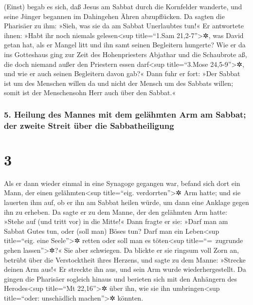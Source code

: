  (Einst) begab es sich, daß Jesus am Sabbat durch die
Kornfelder wanderte, und seine Jünger begannen im Dahingehen Ähren
abzupflücken.  Da sagten die Pharisäer zu ihm: »Sieh, was
sie da am Sabbat Unerlaubtes tun!«  Er antwortete ihnen:
»Habt ihr noch niemals gelesen\textless sup title=``1.Sam
21,2-7''\textgreater✲, was David getan hat, als er Mangel litt und ihn
samt seinen Begleitern hungerte?  Wie er da ins
Gotteshaus ging zur Zeit des Hohenpriesters Abjathar und die Schaubrote
aß, die doch niemand außer den Priestern essen darf\textless sup
title=``3.Mose 24,5-9''\textgreater✲, und wie er auch seinen Begleitern
davon gab?«  Dann fuhr er fort: »Der Sabbat ist um des
Menschen willen da und nicht der Mensch um des Sabbats willen;
 somit ist der Menschensohn Herr auch über den Sabbat.«

\hypertarget{heilung-des-mannes-mit-dem-geluxe4hmten-arm-am-sabbat-der-zweite-streit-uxfcber-die-sabbatheiligung}{%
\subsubsection{5. Heilung des Mannes mit dem gelähmten Arm am Sabbat;
der zweite Streit über die
Sabbatheiligung}\label{heilung-des-mannes-mit-dem-geluxe4hmten-arm-am-sabbat-der-zweite-streit-uxfcber-die-sabbatheiligung}}

\hypertarget{section-2}{%
\section{3}\label{section-2}}

 Als er dann wieder einmal in eine Synagoge gegangen war,
befand sich dort ein Mann, der einen gelähmten\textless sup title=``eig.
verdorrten''\textgreater✲ Arm hatte;  und sie lauerten ihm
auf, ob er ihn am Sabbat heilen würde, um dann eine Anklage gegen ihn zu
erheben.  Da sagte er zu dem Manne, der den gelähmten Arm
hatte: »Stehe auf (und tritt vor) in die Mitte!«  Dann
fragte er sie: »Darf man am Sabbat Gutes tun, oder (soll man) Böses tun?
Darf man ein Leben\textless sup title=``eig. eine Seele''\textgreater✲
retten oder soll man es töten\textless sup title=``=~zugrunde gehen
lassen''\textgreater✲?« Sie aber schwiegen.  Da blickte er
sie ringsum voll Zorn an, betrübt über die Verstocktheit ihres Herzens,
und sagte zu dem Manne: »Strecke deinen Arm aus!« Er streckte ihn aus,
und sein Arm wurde wiederhergestellt.  Da gingen die
Pharisäer sogleich hinaus und berieten sich mit den Anhängern des
Herodes\textless sup title=``Mt 22,16''\textgreater✲ über ihn, wie sie
ihn umbringen\textless sup title=``oder: unschädlich
machen''\textgreater✲ könnten.

